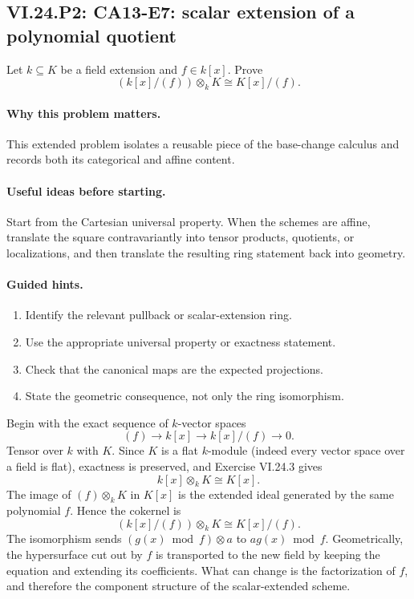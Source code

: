 \subsection*{VI.24.P2: CA13-E7: scalar extension of a polynomial quotient}
\begin{problem}\label{prob:vi24-p02}
Let $k\subseteq K$ be a field extension and $f\in k[x]$. Prove
\[
(k[x]/(f))\otimes_kK\cong K[x]/(f).
\]
\end{problem}

\ifdefined\FullProblemDossiers
\paragraph{Why this problem matters.}
This extended problem isolates a reusable piece of the base-change calculus and records both its categorical and affine content.

\paragraph{Useful ideas before starting.}
Start from the Cartesian universal property.  When the schemes are affine, translate the square contravariantly into tensor products, quotients, or localizations, and then translate the resulting ring statement back into geometry.

\paragraph{Guided hints.}
\begin{enumerate}
\item Identify the relevant pullback or scalar-extension ring.
\item Use the appropriate universal property or exactness statement.
\item Check that the canonical maps are the expected projections.
\item State the geometric consequence, not only the ring isomorphism.
\end{enumerate}

\begin{solution}
Begin with the exact sequence of $k$-vector spaces
\[
(f)\longrightarrow k[x]\longrightarrow k[x]/(f)\longrightarrow0.
\]
Tensor over $k$ with $K$.  Since $K$ is a flat $k$-module (indeed every vector space over a field is flat), exactness is preserved, and Exercise VI.24.3 gives
\[
k[x]\otimes_kK\cong K[x].
\]
The image of $(f)\otimes_kK$ in $K[x]$ is the extended ideal generated by the same polynomial $f$.  Hence the cokernel is
\[
(k[x]/(f))\otimes_kK\cong K[x]/(f).
\]
The isomorphism sends $(g(x)\bmod f)\otimes a$ to $a g(x)\bmod f$.  Geometrically, the hypersurface cut out by $f$ is transported to the new field by keeping the equation and extending its coefficients.  What can change is the factorization of $f$, and therefore the component structure of the scalar-extended scheme.
\end{solution}

